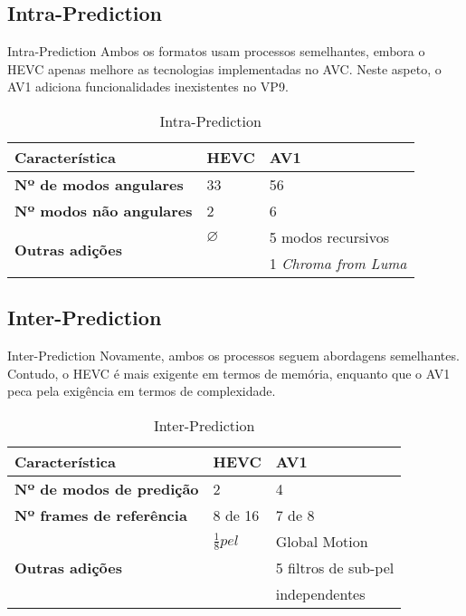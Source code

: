 \documentclass{beamer}
\begin{document}
\subsection{Intra-Prediction}
\begin{frame}{Intra-Prediction}
	Ambos os formatos usam processos semelhantes, embora o HEVC apenas melhore as tecnologias implementadas no AVC. Neste aspeto, o AV1 adiciona funcionalidades inexistentes no VP9.
	\begin{table}
		\centering
		\begin{tabular}{l|l|l}
			\textbf{Característica} 									& \textbf{HEVC} 	& \textbf{AV1} \\\hline
			\textbf{Nº de modos angulares} 						& 33 							& 56 \\
			\textbf{Nº modos não angulares} 					& 2	 							& 6 \\
			\multirow{2}{*}{\textbf{Outras adições}}	& $\varnothing$		& 5 modos recursivos \\
			&									& 1 \textit{Chroma from Luma} \\
		\end{tabular}
		\caption{\label{tab:intra}Intra-Prediction}
	\end{table}
\end{frame}

\subsection{Inter-Prediction}
\begin{frame}{Inter-Prediction}
	Novamente, ambos os processos seguem abordagens semelhantes. Contudo, o HEVC é mais exigente em termos de memória, enquanto que o AV1 peca pela exigência em termos de complexidade.
	\begin{table}
		\centering
		\begin{tabular}{l|l|l}
			\textbf{Característica} 									& \textbf{HEVC} 	& \textbf{AV1} \\\hline
			\textbf{Nº de modos de predição} 					& 2 							& 4 \\
			\textbf{Nº frames de referência} 					& 8 de 16	 				& 7 de 8 \\
			\multirow{3}{*}{\textbf{Outras adições}}	& $\frac{1}{8} pel$		& Global Motion \\
			&									& 5 filtros de sub-pel \\
			&									& independentes \\
		\end{tabular}
		\caption{\label{tab:inter}Inter-Prediction}
	\end{table}
\end{frame}
\end{document}
